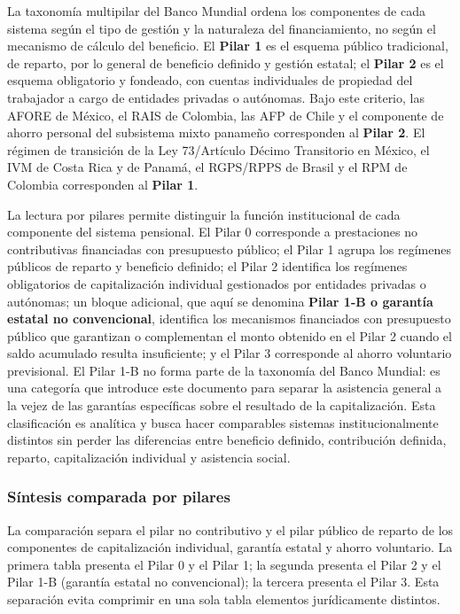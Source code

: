 \documentclass[12pt, letterpaper]{article}
\begin{document}
La taxonomía multipilar del Banco Mundial \citep{holzmann2005} ordena los componentes de cada sistema según el tipo de gestión y la naturaleza del financiamiento, no según el mecanismo de cálculo del beneficio. El \textbf{Pilar 1} es el esquema público tradicional, de reparto, por lo general de beneficio definido y gestión estatal; el \textbf{Pilar 2} es el esquema obligatorio y fondeado, con cuentas individuales de propiedad del trabajador a cargo de entidades privadas o autónomas. Bajo este criterio, las AFORE de México, el RAIS de Colombia, las AFP de Chile y el componente de ahorro personal del subsistema mixto panameño corresponden al \textbf{Pilar 2}. El régimen de transición de la Ley 73/Artículo Décimo Transitorio en México, el IVM de Costa Rica y de Panamá, el RGPS/RPPS de Brasil y el RPM de Colombia corresponden al \textbf{Pilar 1}.

La lectura por pilares permite distinguir la función institucional de cada componente del sistema pensional. El Pilar 0 corresponde a prestaciones no contributivas financiadas con presupuesto público; el Pilar 1 agrupa los regímenes públicos de reparto y beneficio definido; el Pilar 2 identifica los regímenes obligatorios de capitalización individual gestionados por entidades privadas o autónomas; un bloque adicional, que aquí se denomina \textbf{Pilar 1-B o garantía estatal no convencional}, identifica los mecanismos financiados con presupuesto público que garantizan o complementan el monto obtenido en el Pilar 2 cuando el saldo acumulado resulta insuficiente; y el Pilar 3 corresponde al ahorro voluntario previsional. El Pilar 1-B no forma parte de la taxonomía del Banco Mundial: es una categoría que introduce este documento para separar la asistencia general a la vejez de las garantías específicas sobre el resultado de la capitalización. Esta clasificación es analítica y busca hacer comparables sistemas institucionalmente distintos sin perder las diferencias entre beneficio definido, contribución definida, reparto, capitalización individual y asistencia social.

\subsubsection*{Síntesis comparada por pilares}

La comparación separa el pilar no contributivo y el pilar público de reparto de los componentes de capitalización individual, garantía estatal y ahorro voluntario. La primera tabla presenta el Pilar 0 y el Pilar 1; la segunda presenta el Pilar 2 y el Pilar 1-B (garantía estatal no convencional); la tercera presenta el Pilar 3. Esta separación evita comprimir en una sola tabla elementos jurídicamente distintos.
\end{document}
